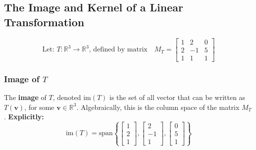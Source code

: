\documentclass[a4paper, 9pt]{extarticle}
\begin{document}
\subsection{The Image and Kernel of a Linear Transformation}
$$
  \text{Let: $T:\mathbb{R}^3 \to \mathbb{R}^3$, defined by matrix} \quad
  M_T = \begin{bmatrix}
    1 & 2  & 0 \\
    2 & -1 & 5 \\
    1 & 1  & 1
  \end{bmatrix}
$$
\subsubsection{Image of $T$}
The \textbf{image} of $T$, denoted $\text{im}(T)$ is the set of all vector that can be written as $T(\textbf{v})$, for some $\mathbf{v} \in \mathbb{R}^3$. Algebraically, this is the column space of the matrix $M_T$. \textbf{Explicitly:}
$$\text{im}(T) = \text{span}\left\{
  \begin{bmatrix}
    1 \\
    2 \\
    1
  \end{bmatrix},
  \begin{bmatrix}
    2  \\
    -1 \\
    1
  \end{bmatrix},
  \begin{bmatrix}
    0 \\
    5 \\
    1
  \end{bmatrix}
  \right\}$$
\end{document}

